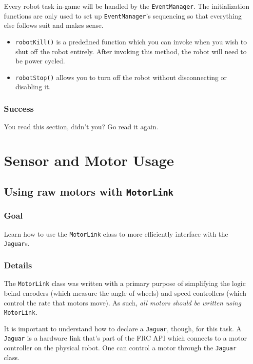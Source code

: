 \documentclass[a4paper]{article}
\begin{document}
Every robot task in-game will be handled by the \lstinline{EventManager}. The initialization functions are only used to set up \lstinline{EventManager}'s sequencing so that everything else follows suit and makes sense. \begin{itemize}\item{\lstinline{robotKill()} is a predefined function which you can invoke when you wish to shut off the robot entirely. After invoking this method, the robot will need to be power cycled.}\item{\lstinline{robotStop()} allows you to turn off the robot without disconnecting or disabling it.}\end{itemize}
\setcounter{subsubsection}{3}\subsubsection{Success} You read this section, didn't you? Go read it again.


\pagebreak\section{Sensor and Motor Usage}\setcounter{subsection}{3}

\subsection{Using raw motors with \lstinline{MotorLink}}
\subsubsection{Goal} Learn how to use the \lstinline{MotorLink} class to more efficiently interface with the \lstinline{Jaguar}s.
\subsubsection{Details} The \lstinline{MotorLink} class was written with a primary purpose of simplifying the logic beind encoders (which measure the angle of wheels) and speed controllers (which control the rate that motors move). As such, \textit{all motors should be written using} \lstinline{MotorLink}. 

It is important to understand how to declare a \lstinline{Jaguar}, though, for this task. A \lstinline{Jaguar} is a hardware link that's part of the FRC API which connects to a motor controller on the physical robot. One can control a motor through the \lstinline{Jaguar} class.
\end{document}
